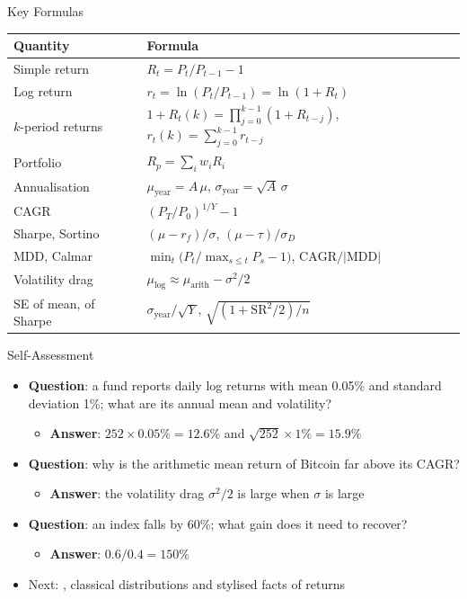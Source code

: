 \begin{frame}{Key Formulas}
\itemsize{\small}
\begin{center}
\footnotesize
\begin{tabular}{ll}
\toprule
\textbf{Quantity} & \textbf{Formula} \\
\midrule
Simple return & $R_t = P_t/P_{t-1} - 1$ \\
Log return & $r_t = \ln(P_t/P_{t-1}) = \ln(1 + R_t)$ \\
$k$-period returns & $1 + R_t(k) = \prod_{j=0}^{k-1}(1 + R_{t-j})$, \quad $r_t(k) = \sum_{j=0}^{k-1} r_{t-j}$ \\
Portfolio & $R_p = \sum_i w_i R_i$ \\
Annualisation & $\mu_{\text{year}} = A\,\mu$, \quad $\sigma_{\text{year}} = \sqrt{A}\,\sigma$ \\
CAGR & $(P_T/P_0)^{1/Y} - 1$ \\
Sharpe, Sortino & $(\mu - r_f)/\sigma$, \quad $(\mu - \tau)/\sigma_D$ \\
MDD, Calmar & $\min_t \big(P_t / \max_{s \le t} P_s - 1\big)$, \quad $\text{CAGR}/|\text{MDD}|$ \\
Volatility drag & $\mu_{\text{log}} \approx \mu_{\text{arith}} - \sigma^2/2$ \\
SE of mean, of Sharpe & $\sigma_{\text{year}}/\sqrt{Y}$, \quad $\sqrt{(1 + \text{SR}^2/2)/n}$ \\
\bottomrule
\end{tabular}
\end{center}
\end{frame}

\begin{frame}{Self-Assessment}
\itemsize{\small}
\begin{itemize}
    \item \textbf{Question}: a fund reports daily log returns with mean 0.05\% and standard deviation 1\%; what are its annual mean and volatility?
    \begin{itemize}
        \item \textbf{Answer}: $252 \times 0.05\% = 12.6\%$ and $\sqrt{252} \times 1\% = 15.9\%$
    \end{itemize}
    \item \textbf{Question}: why is the arithmetic mean return of Bitcoin far above its CAGR?
    \begin{itemize}
        \item \textbf{Answer}: the volatility drag $\sigma^2/2$ is large when $\sigma$ is large
    \end{itemize}
    \item \textbf{Question}: an index falls by 60\%; what gain does it need to recover?
    \begin{itemize}
        \item \textbf{Answer}: $0.6/0.4 = 150\%$
    \end{itemize}
    \item Next: , classical distributions and stylised facts of returns
\end{itemize}
\end{frame}


